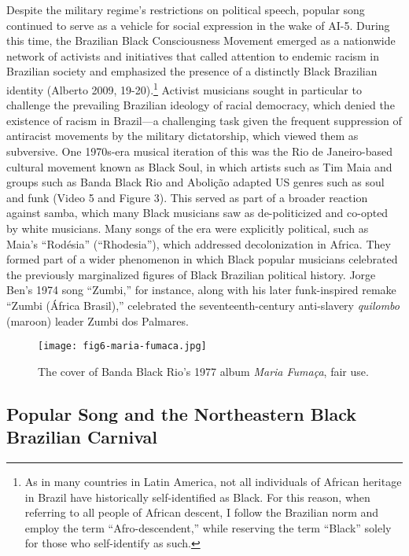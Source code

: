 \documentclass[twoside]{article}
\begin{document}
Despite the military regime's restrictions on political speech, popular
song continued to serve as a vehicle for social expression in the wake
of AI-5. During this time, the Brazilian Black Consciousness Movement
emerged as a nationwide network of activists and initiatives that called
attention to endemic racism in Brazilian society and emphasized the
presence of a distinctly Black Brazilian identity (Alberto
2009, 19-20).\footnote{As in many countries in Latin America, not all
  individuals of African heritage in Brazil have historically
  self-identified as Black. For this reason, when referring to all
  people of African descent, I follow the Brazilian norm and employ the
  term ``Afro-descendent,'' while reserving the term ``Black'' solely
  for those who self-identify as such.} Activist musicians sought in
particular to challenge the prevailing Brazilian ideology of racial
democracy, which denied the existence of racism in Brazil---a
challenging task given the frequent suppression of antiracist movements
by the military dictatorship, which viewed them as subversive. One
1970s-era musical iteration of this was the Rio de Janeiro-based
cultural movement known as Black Soul, in which artists such as Tim Maia
and groups such as Banda Black Rio and Abolição adapted US genres such
as soul and funk (Video 5 and Figure 3). This served as part of a
broader reaction against samba, which many Black musicians saw as
de-politicized and co-opted by white musicians. Many songs of the era
were explicitly political, such as Maia's ``Rodésia'' (``Rhodesia''),
which addressed decolonization in Africa. They formed part of a wider
phenomenon in which Black popular musicians celebrated the previously
marginalized figures of Black Brazilian political history. Jorge Ben's
1974 song ``Zumbi,'' for instance, along with his later funk-inspired
remake ``Zumbi (África Brasil),'' celebrated the seventeenth-century
anti-slavery \emph{quilombo} (maroon) leader Zumbi dos Palmares.

\begin{figure}
  \texttt{[image: fig6-maria-fumaca.jpg]}
  \caption{The cover of Banda Black Rio's 1977 album \emph{Maria Fumaça}, fair use.}
\end{figure}

\hypertarget{popular-song-and-the-northeastern-black-brazilian-carnival}{%
\subsection*{Popular Song and the Northeastern Black Brazilian
Carnival}\label{popular-song-and-the-northeastern-black-brazilian-carnival}}
\end{document}
